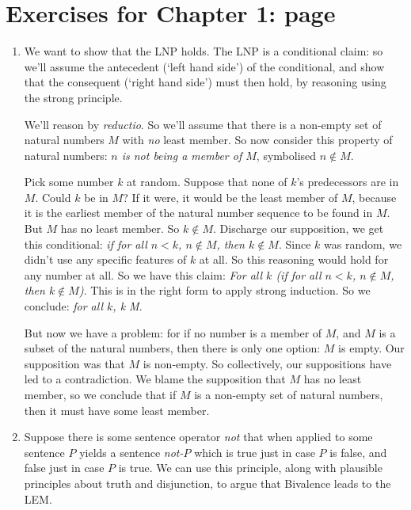 
\section*{Exercises for Chapter 1: page \pageref{ex1}} \label{ans1}

\begin{enumerate}
	\item We want to show that the LNP holds. The LNP is a conditional claim: so we'll assume the antecedent (`left hand side') of the conditional, and show that the consequent (`right hand side') must then hold, by reasoning using the strong principle.

	We'll reason by \emph{reductio}. So we'll assume that there is a non-empty set of natural numbers $M$ with \emph{no} least member. So now consider this property of natural numbers: \emph{$n$ is not being a member of $M$}, symbolised $n \notin M$.

	Pick some number $k$ at random. Suppose that none of $k$'s  predecessors are in $M$. Could $k$ be in $M$? If it were, it would be the least member of $M$, because it is the earliest member of the natural number sequence to be found in $M$. But $M$ has no least member. So $k\notin M$. Discharge our supposition, we get this conditional: \emph{if for all $n<k$, $n\notin M$, then $k\notin M$}. Since $k$ was random, we didn't use any specific features of $k$ at all. So this reasoning would hold for any number at all. So we have this claim: \emph{For all $k$ (if for all $n<k$, $n\notin M$, then $k\notin M$)}. This is in the right form to apply strong induction. So we conclude: \emph{for all $k$, k \notin M}.

	But now we have a problem: for if no number is a member of $M$, and $M$ is a subset of the natural numbers, then there is only one option: $M$ is empty. Our supposition was that $M$ is non-empty. So collectively,  our suppositions have led to a contradiction. We blame the supposition that $M$ has no least member, so we conclude that if $M$ is a non-empty set of natural numbers, then it must have some least member.

	 \item  Suppose there is some sentence operator \emph{not} that when applied to some sentence $P$ yields a sentence \emph{not-$P$} which is true just in case $P$ is false, and false just in case $P$ is true. We can use this principle, along with plausible principles about truth and disjunction, to argue that Bivalence leads to the LEM.


\end{enumerate}
